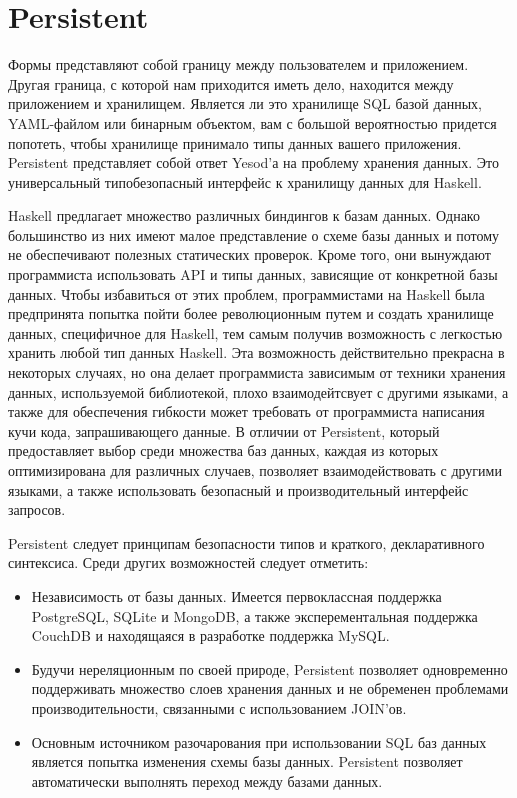 \chapter{Persistent}\label{chap:persistent}

Формы представляют собой границу между пользователем и приложением. Другая граница, с которой нам приходится иметь дело, находится между приложением и хранилищем. Является ли это хранилище SQL базой данных, YAML-файлом или бинарным объектом, вам с большой вероятностью придется попотеть, чтобы хранилище принимало типы данных вашего приложения. Persistent представляет собой ответ Yesod'а на проблему хранения данных. Это универсальный типобезопасный интерфейс к хранилищу данных для Haskell.

Haskell предлагает множество различных биндингов к базам данных. Однако большинство из них имеют малое представление о схеме базы данных и потому не обеспечивают полезных статических проверок. Кроме того, они вынуждают программиста использовать API и типы данных, зависящие от конкретной базы данных. Чтобы избавиться от этих проблем, программистами на Haskell была предпринята попытка пойти более революционным путем и создать хранилище данных, специфичное для Haskell, тем самым получив возможность с легкостью хранить любой тип данных Haskell. Эта возможность действительно прекрасна в некоторых случаях, но она делает программиста зависимым от техники хранения данных, используемой библиотекой, плохо взаимодейтсвует с другими языками, а также для обеспечения гибкости может требовать от программиста написания кучи кода, запрашивающего данные. В отличии от Persistent, который предоставляет выбор среди множества баз данных, каждая из которых оптимизирована для различных случаев, позволяет взаимодействовать с другими языками, а также использовать безопасный и производительный интерфейс запросов.

Persistent следует принципам безопасности типов и краткого, декларативного синтексиса. Среди других возможностей следует отметить:

\begin{itemize}
  \item Независимость от базы данных. Имеется первоклассная поддержка PostgreSQL, SQLite и MongoDB, а также эксперементальная поддержка CouchDB и находящаяся в разработке поддержка MySQL.
  \item Будучи нереляционным по своей природе, Persistent позволяет одновременно поддерживать множество слоев хранения данных и не обременен проблемами производительности, связанными с использованием JOIN'ов.
  \item Основным источником разочарования при использовании SQL баз данных является попытка изменения схемы базы данных. Persistent позволяет автоматически выполнять переход между базами данных. %
\end{itemize}

